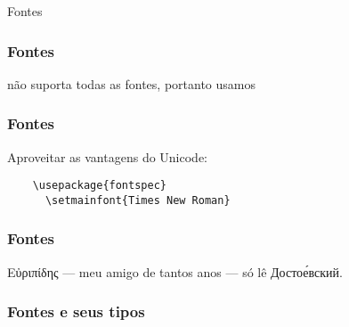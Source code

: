 \begin{frame}[standout]
  \Huge
  Fontes
\end{frame}

\begin{frame}
  \frametitle{Fontes}
  \huge
   não suporta todas as fontes, portanto usamos 
\end{frame}

\begin{frame}[fragile]
  \frametitle{Fontes}
  \huge
  Aproveitar as vantagens do Unicode:
  \begin{verbatim}
    \usepackage{fontspec}
      \setmainfont{Times New Roman}
  \end{verbatim}
\end{frame}

\begin{frame}
  \frametitle{Fontes}
  \Huge
  Εὐριπίδης — meu amigo de tantos anos — só lê Достое́вский.
\end{frame}

\begin{frame}[fragile]
  \frametitle{Fontes e seus tipos}
  \Huge
\end{frame}

